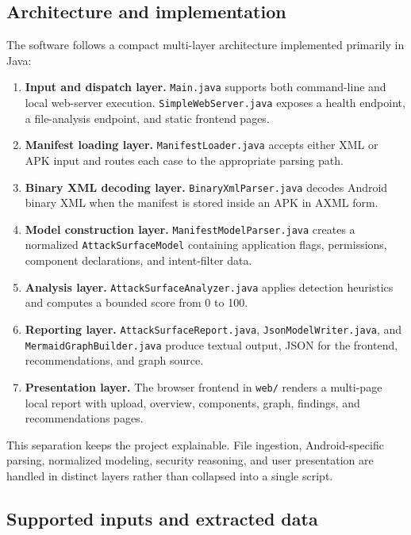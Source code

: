 \documentclass[preprint,12pt,a4paper]{elsarticle}
\begin{document}
\subsection{Architecture and implementation}

The software follows a compact multi-layer architecture implemented primarily in Java:

\begin{enumerate}[leftmargin=*,label=\textbf{\arabic*.}]
\item \textbf{Input and dispatch layer.} \texttt{Main.java} supports both command-line and local web-server execution. \texttt{SimpleWebServer.java} exposes a health endpoint, a file-analysis endpoint, and static frontend pages.
\item \textbf{Manifest loading layer.} \texttt{ManifestLoader.java} accepts either XML or APK input and routes each case to the appropriate parsing path.
\item \textbf{Binary XML decoding layer.} \texttt{BinaryXmlParser.java} decodes Android binary XML when the manifest is stored inside an APK in AXML form.
\item \textbf{Model construction layer.} \texttt{ManifestModelParser.java} creates a normalized \texttt{AttackSurfaceModel} containing application flags, permissions, component declarations, and intent-filter data.
\item \textbf{Analysis layer.} \texttt{AttackSurfaceAnalyzer.java} applies detection heuristics and computes a bounded score from 0 to 100.
\item \textbf{Reporting layer.} \texttt{AttackSurfaceReport.java}, \texttt{JsonModelWriter.java}, and \texttt{MermaidGraphBuilder.java} produce textual output, JSON for the frontend, recommendations, and graph source.
\item \textbf{Presentation layer.} The browser frontend in \texttt{web/} renders a multi-page local report with upload, overview, components, graph, findings, and recommendations pages.
\end{enumerate}

This separation keeps the project explainable. File ingestion, Android-specific parsing, normalized modeling, security reasoning, and user presentation are handled in distinct layers rather than collapsed into a single script.

\subsection{Supported inputs and extracted data}
\end{document}
